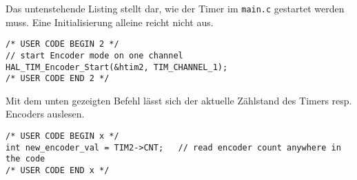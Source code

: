 Das untenstehende Listing stellt dar, wie der Timer im \texttt{main.c} gestartet werden muss.
Eine Initialisierung alleine reicht nicht aus.

\begin{lstlisting}[style=Cuvision, caption={Timer im Encoder Modus starten}]
/* USER CODE BEGIN 2 */
// start Encoder mode on one channel
HAL_TIM_Encoder_Start(&htim2, TIM_CHANNEL_1);
/* USER CODE END 2 */
\end{lstlisting}

Mit dem unten gezeigten Befehl lässt sich der aktuelle Zählstand des Timers resp. Encoders auslesen.

\begin{lstlisting}[style=Cuvision, caption={Encoderwert auslesen}]
/* USER CODE BEGIN x */
int new_encoder_val = TIM2->CNT;   // read encoder count anywhere in the code 
/* USER CODE END x */
\end{lstlisting}




